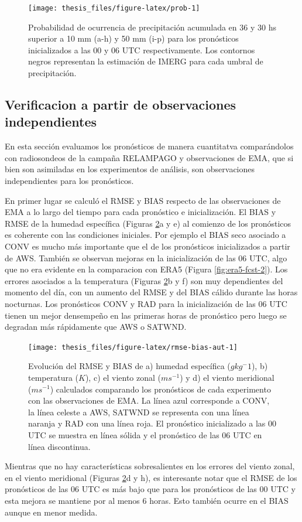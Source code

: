 \documentclass[12pt,oneside,a4paper]{reedthesis}
\begin{document}
\begin{figure}

{\centering \texttt{[image: thesis\_files/figure-latex/prob-1]} 

}

\caption{Probabilidad de ocurrencia de precipitación acumulada en 36 y 30 hs superior a 10 mm (a-h) y 50 mm (i-p) para los pronósticos inicializados a las 00 y 06 UTC respectivamente. Los contornos negros representan la estimación de IMERG para cada umbral de precipitación.}\label{fig:prob}
\end{figure}
\hypertarget{verificacion-a-partir-de-observaciones-independientes}{%
\subsection{Verificacion a partir de observaciones independientes}\label{verificacion-a-partir-de-observaciones-independientes}}

En esta sección evaluamos los pronósticos de manera cuantitatva comparándolos con radiosondeos de la campaña RELAMPAGO y observaciones de EMA, que si bien son asimiladas en los experimentos de análisis, son observaciones independientes para los pronósticos.

En primer lugar se calculó el RMSE y BIAS respecto de las observaciones de EMA a lo largo del tiempo para cada pronóstico e inicialización. El BIAS y RMSE de la humedad específica (Figuras \ref{fig:rmse-bias-aut}a y e) al comienzo de los pronósticos es coherente con las condiciones iniciales. Por ejemplo el BIAS seco asociado a CONV es mucho más importante que el de los pronósticos inicializados a partir de AWS. También se observan mejoras en la inicialización de las 06 UTC, algo que no era evidente en la comparacion con ERA5 (Figura \ref{fig:era5-fcst-2}). Los errores asociados a la temperatura (Figuras \ref{fig:rmse-bias-aut}b y f) son muy dependientes del momento del día, con un aumento del RMSE y del BIAS cálido durante las horas nocturnas. Los pronósticos CONV y RAD para la inicialización de las 06 UTC tienen un mejor densempeño en las primeras horas de pronóstico pero luego se degradan más rápidamente que AWS o SATWND.


\begin{figure}
\texttt{[image: thesis\_files/figure-latex/rmse-bias-aut-1]} \caption{Evolución del RMSE y BIAS de a) humedad específica (\(gkg{^-1}\)), b) temperatura (\(K\)), c) el viento zonal (\(ms^{-1}\)) y d) el viento meridional (\(ms^{-1}\)) calculados comparando los pronósticos de cada experimento con las observaciones de EMA. La línea azul corresponde a CONV, la línea celeste a AWS, SATWND se representa con una línea naranja y RAD con una línea roja. El pronóstico inicializado a las 00 UTC se muestra en línea sólida y el pronóstico de las 06 UTC en línea discontinua.}\label{fig:rmse-bias-aut}
\end{figure}
Mientras que no hay características sobresalientes en los errores del viento zonal, en el viento meridional (Figuras \ref{fig:rmse-bias-aut}d y h), es interesante notar que el RMSE de los pronósticos de las 06 UTC es más bajo que para los pronósticos de las 00 UTC y esta mejora se mantiene por al menos 6 horas. Esto también ocurre en el BIAS aunque en menor medida.
\end{document}
